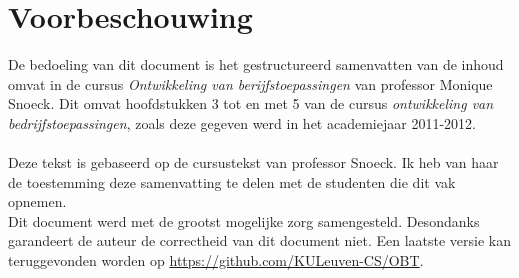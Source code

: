 \documentclass[../main.tex]{subfiles}
\begin{document}
\chapter*{Voorbeschouwing}
De bedoeling van dit document is het gestructureerd samenvatten van de inhoud omvat in de cursus \textit{Ontwikkeling van berijfstoepassingen} van professor Monique Snoeck. Dit omvat hoofdstukken 3 tot en met 5 van de cursus \textit{ontwikkeling van bedrijfstoepassingen}, zoals deze gegeven werd in het academiejaar 2011-2012.\\
\\
Deze tekst is gebaseerd op de cursustekst van professor Snoeck. Ik heb van haar de toestemming deze samenvatting  te delen met de studenten die dit vak opnemen.
\\
Dit document werd met de grootst mogelijke zorg samengesteld. Desondanks garandeert de auteur de correctheid van dit document niet. Een laatste versie kan teruggevonden worden op \url{https://github.com/KULeuven-CS/OBT}.
\end{document}
